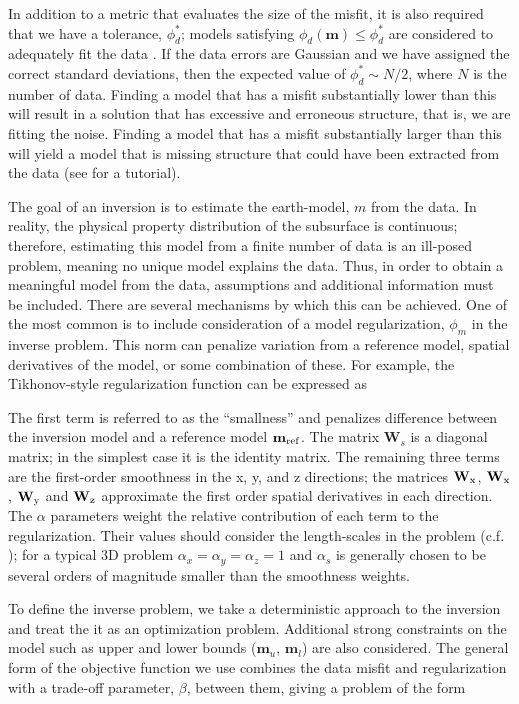 In addition to a metric that evaluates the size of the misfit, it is also required that we have a tolerance, $\phi_d^*$; models satisfying $\phi_d(\mathbf{m}) \leq \phi_d^*$ are considered to adequately fit the data \citep{Parker1994}. If the data errors are Gaussian and we have assigned the correct standard deviations, then the expected value of $\phi_d^* \sim N/2$, where $N$ is the number of data. Finding a model that has a misfit substantially lower than this will result in a solution that has excessive and erroneous structure, that is, we are fitting the noise. Finding a model that has a misfit substantially larger than this will yield a model that is missing structure that could have been extracted from the data (see \cite{Oldenburg2005} for a tutorial).

The goal of an inversion is to estimate the earth-model, $m$ from the data. In reality, the physical property distribution of the subsurface is continuous; therefore, estimating this model from a finite number of data is an ill-posed problem, meaning no unique model explains the data. Thus, in order to obtain a meaningful model from the data, assumptions and additional information must be included. There are several mechanisms by which this can be achieved. One of the most common is to include consideration of a model regularization, $\phi_m$ in the inverse problem. This norm can penalize variation from a reference model, spatial derivatives of the model, or some combination of these. For example, the Tikhonov-style regularization function can be expressed as


The first term is referred to as the ``smallness'' and penalizes difference between the inversion model and a reference model $\mathbf{m_{\rm ref}}$. The matrix $\mathbf{W}_s$ is a diagonal matrix; in the simplest case it is the identity matrix. The remaining three terms are the first-order smoothness in the x, y, and z directions; the matrices $\mathbf{W}_{\rm x}$, $\mathbf{W}_{\rm x}$, $\mathbf{W}_{\rm y}$ and $\mathbf{W}_{\rm z}$ approximate the first order spatial derivatives in each direction. The $\alpha$ parameters weight the relative contribution of each term to the regularization. Their values should consider the length-scales in the problem (c.f. \cite{Oldenburg2005}); for a typical 3D problem $\alpha_x = \alpha_y = \alpha_z = 1$ and $\alpha_s$ is generally chosen to be several orders of magnitude smaller than the smoothness weights.

To define the inverse problem, we take a deterministic approach to the inversion and treat the it as an optimization problem. Additional strong constraints on the model such as upper and lower bounds ($\mathbf{m}_u$, $\mathbf{m}_l$) are also considered. The general form of the objective function we use combines the data misfit and regularization with a trade-off parameter, $\beta$, between them, giving a problem of the form

